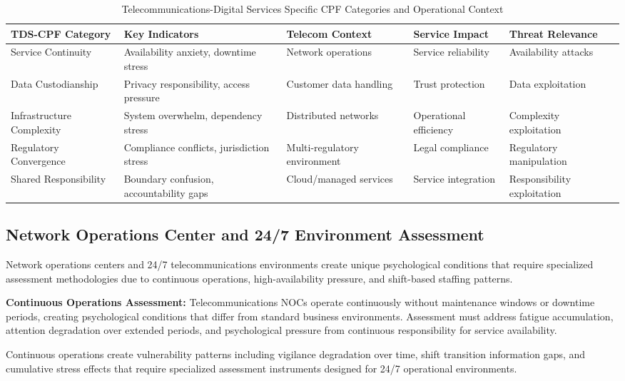 \documentclass[10pt, twocolumn]{article}
\begin{document}
\begin{table*}[t]
\caption{Telecommunications-Digital Services Specific CPF Categories and Operational Context}
\label{tab:telecom_cpf_categories}
\centering
\small
\begin{tabular}{@{}p{3.0cm} p{2.8cm} p{2.6cm} p{2.8cm} p{2.8cm}@{}}
\toprule
\textbf{TDS-CPF Category} & \textbf{Key Indicators} & \textbf{Telecom Context} & \textbf{Service Impact} & \textbf{Threat Relevance} \\
\midrule
Service Continuity & Availability anxiety, downtime stress & Network operations & Service reliability & Availability attacks \\
\midrule
Data Custodianship & Privacy responsibility, access pressure & Customer data handling & Trust protection & Data exploitation \\
\midrule
Infrastructure Complexity & System overwhelm, dependency stress & Distributed networks & Operational efficiency & Complexity exploitation \\
\midrule
Regulatory Convergence & Compliance conflicts, jurisdiction stress & Multi-regulatory environment & Legal compliance & Regulatory manipulation \\
\midrule
Shared Responsibility & Boundary confusion, accountability gaps & Cloud/managed services & Service integration & Responsibility exploitation \\
\bottomrule
\end{tabular}
\end{table*}

\subsection{Network Operations Center and 24/7 Environment Assessment}

Network operations centers and 24/7 telecommunications environments create unique psychological conditions that require specialized assessment methodologies due to continuous operations, high-availability pressure, and shift-based staffing patterns.

\textbf{Continuous Operations Assessment:} Telecommunications NOCs operate continuously without maintenance windows or downtime periods, creating psychological conditions that differ from standard business environments. Assessment must address fatigue accumulation, attention degradation over extended periods, and psychological pressure from continuous responsibility for service availability.

Continuous operations create vulnerability patterns including vigilance degradation over time, shift transition information gaps, and cumulative stress effects that require specialized assessment instruments designed for 24/7 operational environments.
\end{document}
